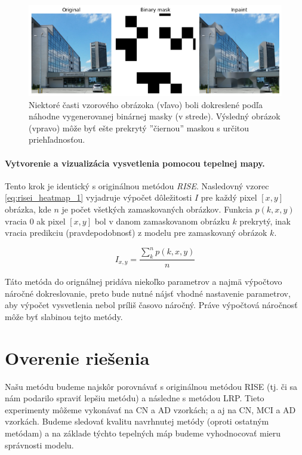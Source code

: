 \begin{figure}[h!]
    \centering
    \includegraphics[width=13cm]{assets/images/risei_inpainting_example.png}
    \caption{Niektoré časti vzorového obrázoka (vľavo) boli dokreslené podľa náhodne vygenerovanej binárnej masky (v strede). Výsledný obrázok (vpravo) môže byť ešte prekrytý ''čiernou'' maskou s určitou priehľadnosťou.}
    \label{fig:risei_inpainting_example}
\end{figure}

\paragraph{Vytvorenie a vizualizácia vysvetlenia pomocou tepelnej mapy.}

Tento krok je identický s originálnou metódou \textit{RISE}. Nasledovný vzorec \ref{eq:risei_heatmap_1} vyjadruje výpočet dôležitosti $I$ pre každý pixel $[x, y]$ obrázka, kde $n$ je počet všetkých zamaskovaných obrázkov. Funkcia $p(k, x, y)$ vracia $0$ ak pixel $[x, y]$ bol v danom zamaskovanom obrázku $k$ prekrytý, inak vracia predikciu (pravdepodobnosť) z modelu pre zamaskovaný obrázok $k$.

\begin{equation}
    I_{x, y} = \frac{\sum_{k}^{n} p(k, x, y)}{n}
    \label{eq:risei_heatmap_1}
\end{equation}

Táto metóda do orignálnej pridáva niekoľko parametrov a najmä výpočtovo náročné dokreslovanie, preto bude nutné nájsť vhodné nastavenie parametrov, aby výpočet vysvetlenia nebol príliš časovo náročný. Práve výpočtová náročnosť môže byť slabinou tejto metódy.

\section{Overenie riešenia}

Našu metódu budeme najskôr porovnávať s originálnou metódou RISE (tj. či sa nám podarilo spraviť lepšiu metódu) a následne s metódou LRP. Tieto experimenty môžeme vykonávať na CN a AD vzorkách; a aj na CN, MCI a AD vzorkách. Budeme sledovať kvalitu navrhnutej metódy (oproti ostatným metódam) a na základe týchto tepelných máp budeme vyhodnocovať mieru správnosti modelu.


